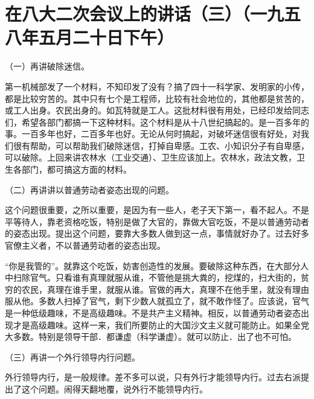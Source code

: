 \section[在八大二次会议上的讲话（三）（一九五八年五月二十日下午）]{在八大二次会议上的讲话（三）（一九五八年五月二十日下午）}


（一）再讲破除迷信。

第一机械部发了一个材料，不知印发了没有？搞了四十一科学家、发明家的小传，都是比较穷苦的。其中只有七个是工程师，比较有社会地位的，其他都是贫苦的，或工人出身。农民出身的。如瓦特就是工人。这批材料很有用处，已经印发给同志们，希望各部门都搞一下这种材料。这个材料是从十八世纪搞起的。是一百多年的事。一百多年也好，二百多年也好。无论从何时搞起，对破坏迷信很有好处，对我们很有帮助，可以帮助我们破除迷信，打掉自卑感。工农、小知识分子有自卑感，可以破除。上回来讲农林水（工业交通）、卫生应该加上。农林水，政法文教，卫生各部门，都可搞这方面的材料。

（二）再讲讲以普通劳动者姿态出现的问题。

这个问题很重要，之所以重要，是因为有一些人，老子天下第一，看不起人。不是平等待人，靠老资格吃饭，特别是做了大官的，靠做大官吃饭，不是以普通劳动者的姿态出现。提出这个问题，要靠大多数人做到这一点，事情就好办了。过去好多官僚主义者，不以普通劳动者的姿态出现。

“你是我管的”。就靠这个吃饭，妨害创造性的发展。要破除这种东西，在大部分人中扫除官气。只看谁有真理就服从谁，不管他是挑大粪的，挖煤的，扫大街的，贫穷的农民，真理在谁手里，就服从谁。官做的再大，真理不在他手里，就没有理由服从他。多数人扫掉了官气，剩下少数人就孤立了，就不敢作怪了。应该说，官气是一种低级趣味，不是高级趣味。不是共产主义精神。相反，以普通劳动者姿态出现才是高级趣味。这样一来，我们所要防止的大国沙文主义就可能防止。如果全党大多数。特别是领导干部．都谦虚（科学谦虚）。就可以防止．出了也不可怕。

（三）再讲一个外行领导内行问题。

外行领导内行，是一般规律。差不多可以说，只有外行才能领导内行。过去右派提出了这个问题。闹得天翻地覆，说外行不能领导内行。

